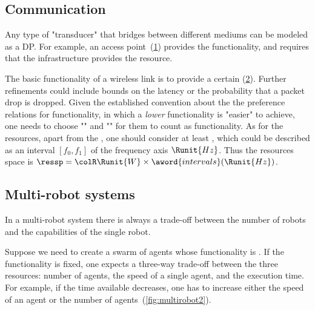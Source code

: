 
\subsection{Communication}

\begin{example}[Transducers]
    Any type of "transducer" that bridges between different
    mediums can be modeled as a DP. For example, an access point~(\cref{fig:accesspoint})
    provides the  functionality, and requires
    that the infrastructure provides the  resource.
\end{example}


\begin{figure}[h]
    \centering
    \caption{\label{fig:accesspoint}}
\end{figure}

\begin{example}
    The basic functionality of a wireless link is to provide
    a certain  (\cref{fig:networklink}). Further refinements could include bounds
    on the latency or the probability that a packet drop is dropped. Given
    the established convention about the the preference relations for
    functionality, in which a \emph{lower} functionality is "easier"
    to achieve, one needs to choose ""
    and "" for them
    to count as functionality. As for the resources, apart from the , one should consider at least ,
    which could be described as an interval $[f_0,f_1]$ of the frequency
    axis $\Runit{Hz}$. Thus the resources space is $\ressp=\colR\Runit{W}\times\aword{intervals}(\Runit{Hz})$.
\end{example}

\begin{figure}[h]
    \begin{center}
    \end{center}
    \caption{ \label{fig:networklink}}
\end{figure}

\subsection{Multi-robot systems}

In a multi-robot system there is always a trade-off between the number
of robots and the capabilities of the single robot.
\begin{example}
    Suppose we need to create a swarm of agents whose functionality is
    . If the functionality is fixed, one expects
    a three-way trade-off between the three resources: number of agents,
    the speed of a single agent, and the execution time. For example,
    if the time available decreases, one has to increase either the speed
    of an agent or the number of agents~(\cref{fig:multirobot2}).
\end{example}

